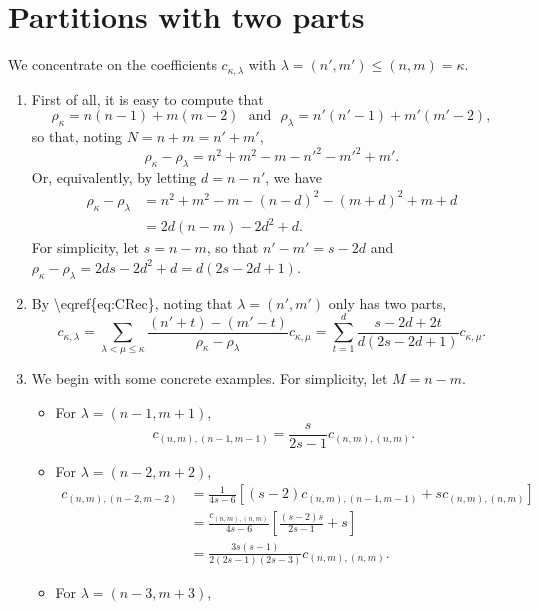 \documentclass[10pt,oneside,american]{amsart}
\numberwithin{equation}{section}
\numberwithin{figure}{section}
\theoremstyle{definition}
\theoremstyle{remark}
\theoremstyle{plain}
\theoremstyle{definition}
\theoremstyle{plain}
\theoremstyle{plain}
\theoremstyle{plain}
\begin{document}
\section{Partitions with two parts}
We concentrate on the coefficients $c_{\kappa,\lambda}$ with $\lambda=\left(n',m'\right)\leq\left(n,m\right)=\kappa$. 
\begin{enumerate}
\item First of all, it is easy to compute that 
\[
\rho_{\kappa}=n\left(n-1\right)+m\left(m-2\right)\ \ \ \text{and}\ \ \ \rho_{\lambda}=n'\left(n'-1\right)+m'\left(m'-2\right),
\]
so that, noting $N=n+m=n'+m'$, 
\[
\rho_{\kappa}-\rho_{\lambda}=n^{2}+m^{2}-m-n'^{2}-m'^{2}+m'.
\]
Or, equivalently, by letting $d=n-n'$, we have 
\begin{align*}
\rho_{\kappa}-\rho_{\lambda} & =n^{2}+m^{2}-m-\left(n-d\right)^{2}-\left(m+d\right)^{2}+m+d\\
 & =2d\left(n-m\right)-2d^{2}+d.
\end{align*}
For simplicity, let $s=n-m$, so that $n'-m'=s-2d$ and $\rho_{\kappa}-\rho_{\lambda}=2ds-2d^{2}+d=d\left(2s-2d+1\right)$. 
\item By \textbackslash{}eqref\{eq:CRec\}, noting that $\lambda=\left(n',m'\right)$
only has two parts,
\[
c_{\kappa,\lambda}=\sum_{\lambda<\mu\leq\kappa}\frac{\left(n'+t\right)-\left(m'-t\right)}{\rho_{\kappa}-\rho_{\lambda}}c_{\kappa,\mu}=\sum_{t=1}^{d}\frac{s-2d+2t}{d\left(2s-2d+1\right)}c_{\kappa,\mu}.
\]
\item We begin with some concrete examples. For simplicity, let $M=n-m$. 
\begin{itemize}
\item For $\lambda=\left(n-1,m+1\right)$, 
\[
c_{\left(n,m\right),\left(n-1,m-1\right)}=\frac{s}{2s-1}c_{\left(n,m\right),\left(n,m\right)}.
\]
\item For $\lambda=\left(n-2,m+2\right)$, 
\begin{align*}
c_{\left(n,m\right),\left(n-2,m-2\right)} & =\frac{1}{4s-6}\left[\left(s-2\right)c_{\left(n,m\right),\left(n-1,m-1\right)}+sc_{\left(n,m\right),\left(n,m\right)}\right]\\
 & =\frac{c_{\left(n,m\right),\left(n,m\right)}}{4s-6}\left[\frac{\left(s-2\right)s}{2s-1}+s\right]\\
 & =\frac{3s\left(s-1\right)}{2\left(2s-1\right)\left(2s-3\right)}c_{\left(n,m\right),\left(n,m\right)}.
\end{align*}
\item For $\lambda=\left(n-3,m+3\right)$, 
\begin{align*}

\end{align*}
\end{itemize}
\end{enumerate}
\end{document}
